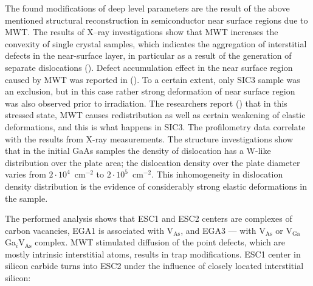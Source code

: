 \documentclass[final,3p,times,twocolumn,authoryear]{elsarticle}
\begin{document}
The found modifications of deep level parameters are the result of the above mentioned
structural reconstruction in semiconductor near surface regions  due to MWT.
The results of X--ray investigations show that MWT increases the convexity of single crystal samples,
which indicates the aggregation of interstitial defects in the near-surface layer,
in particular as a result of the generation of separate dislocations (\cite{BoltovetsEn,Konakova2012FTPEn}).
Defect accumulation effect in the near surface region caused by MWT was reported in (\cite{BoltovetsEn,Konakova2015En}).
To a certain extent, only SIC3 sample was an exclusion, but in this case rather strong deformation of near surface region was also observed prior to irradiation.
The researchers report (\cite{Bacherikov2003En,Pashkov1994En,BoltovetsEn,Milenin1994En,BelyaevIntac}) that in this stressed state,
MWT causes redistribution as well as certain weakening of elastic deformations, and this is what happens in SIC3.
The profilometry data correlate with the results from X-ray measurements.
The structure investigations show that
in the initial GaAs samples the density of dislocation has a W-like distribution over the plate area; the dislocation density over the plate diameter varies from $2\cdot10^{4}$~cm$^{-2}$ to $2\cdot10^{5}$~cm$^{-2}$.
This inhomogeneity in dislocation density distribution is the evidence of considerably strong elastic deformations in the sample.



%
%
%
%
%
%

The performed analysis shows that ESC1 and ESC2 centers are complexes of carbon vacancies,
EGA1 is associated with V$_\mathrm{As}$,
and EGA3 — with V$_\mathrm{As}$ or  V$_\mathrm{Ga}$Ga$_i$V$_\mathrm{As}$ complex.
MWT stimulated diffusion of the point defects, which are mostly intrinsic interstitial atoms, results in trap modifications.
ESC1 center in silicon carbide turns into ESC2 under the influence of closely located interstitial silicon:
\end{document}
